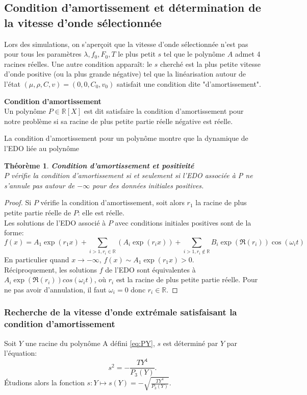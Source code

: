 \documentclass[11pt]{article}
\newtheorem{theorem}{Théorème}
\begin{document}
\subsection{Condition d'amortissement et détermination de la vitesse d'onde sélectionnée}
Lors des simulations, on s’aperçoit que la vitesse d'onde sélectionnée n'est pas pour tous les paramètres $\lambda,f_0,F_0,T$ le plus petit $s$ tel que le polynôme $A$ admet 4 racines réelles. Une autre condition apparaît: le $s$ cherché est la plus petite vitesse d'onde positive (ou la plus grande négative) tel que la linéarisation autour de l’état $(\mu,\rho,C,v) = (0,0,C_0,v_0)$ satisfait une condition dite "d'amortissement".
\begin{definition}{\textbf{Condition d'amortissement}} \\ Un polynôme $P \in \mathbb{R}[X]$ est dit satisfaire la condition d'amortissement pour notre problème si sa racine de plus petite partie réelle négative est réelle.
\end{definition}

La condition d'amortissement pour un polynôme montre que la dynamique de l'EDO liée au polynôme
\begin{theorem}\textbf{{Condition d'amortissement et positivité} }\\
$P$ vérifie la condition d'amortissement si et seulement si l'EDO associée à P ne s'annule pas autour de $-\infty$ pour des données initiales positives.
\end{theorem}
\begin{proof}Si $P$ vérifie la condition d'amortissement, soit alors $r_1$ la racine de plus petite partie réelle de $P$: elle est réelle. \\ 
Les solutions de l'EDO associé à $P$ avec conditions initiales positives sont de la forme: \begin{equation}
	f(x)=A_1\exp(r_1x)+ \sum_{i>1,r_i\in\mathbb{R}}(A_i\exp(r_ix)) + \sum_{i>1,r_i\not\in\mathbb{R}}B_i\exp(\Re(r_i))\cos(\omega_it)
\end{equation}
En particulier quand $x\to -\infty$, $f(x)\sim  A_1\exp(r_1x) >0$.\\
Réciproquement, les solutions $f$ de l'EDO sont équivalentes à $A_i\exp(\Re(r_i))cos(\omega_it)$, où $r_i$ est la racine de plus petite partie réelle. Pour ne pas avoir d’annulation, il faut $\omega_i =0 $ donc $r_i \in \mathbb{R}.$
\end{proof}


\subsubsection{Recherche de la vitesse d'onde extrémale satisfaisant la condition d'amortissement}
Soit $Y$ une racine du polynôme A défini \ref{eq:PY}, $s$ est déterminé par $Y$ par l'équation: \begin{equation}
	s^2 = -\frac{TY^4}{P_3(Y)}. \label{eq:sfromY}
\end{equation} 
Étudions alors la fonction $ s: Y \mapsto s(Y) = -\sqrt{\frac{TY^4}{P_3(Y)}} $.
\end{document}

